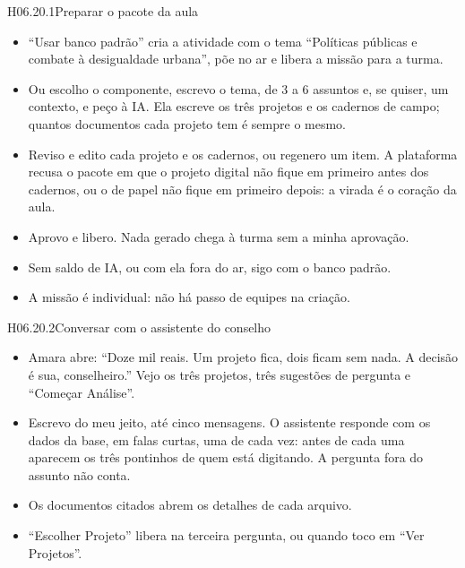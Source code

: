 \begin{historia}{H06.20.1}{Preparar o pacote da aula}{\pronto}
\aceite
\begin{itemize}
  \item \enquote{Usar banco padrão} cria a atividade com o tema
    \enquote{Políticas públicas e combate à desigualdade urbana}, põe no ar e
    libera a missão para a turma.
  \item Ou escolho o componente, escrevo o tema, de 3 a 6 assuntos e, se
    quiser, um contexto, e peço à IA. Ela escreve os três projetos e os
    cadernos de campo; quantos documentos cada projeto tem é sempre o mesmo.
  \item Reviso e edito cada projeto e os cadernos, ou regenero um item. A
    plataforma recusa o pacote em que o projeto digital não fique em primeiro
    antes dos cadernos, ou o de papel não fique em primeiro depois: a virada
    é o coração da aula.
  \item Aprovo e libero. Nada gerado chega à turma sem a minha aprovação.
  \item Sem saldo de IA, ou com ela fora do ar, sigo com o banco padrão.
  \item A missão é individual: não há passo de equipes na criação.
\end{itemize}
\end{historia}

\begin{historia}{H06.20.2}{Conversar com o assistente do conselho}{\pronto}
\aceite
\begin{itemize}
  \item Amara abre: \enquote{Doze mil reais. Um projeto fica, dois ficam sem
    nada. A decisão é sua, conselheiro.} Vejo os três projetos, três
    sugestões de pergunta e \enquote{Começar Análise}.
  \item Escrevo do meu jeito, até cinco mensagens. O assistente responde com
    os dados da base, em falas curtas, uma de cada vez: antes de cada uma
    aparecem os três pontinhos de quem está digitando. A pergunta fora do
    assunto não conta.
  \item Os documentos citados abrem os detalhes de cada arquivo.
  \item \enquote{Escolher Projeto} libera na terceira pergunta, ou quando
    toco em \enquote{Ver Projetos}.
\end{itemize}
\end{historia}

